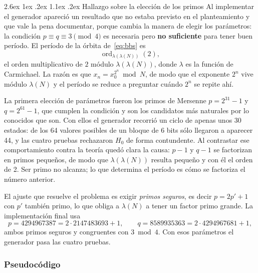 \documentclass[11pt,letterpaper]{article}
\makeatletter
\renewcommand\paragraph{\@startsection{paragraph}{4}{\z@}%
  {2.6ex \@plus 1ex \@minus .2ex}%
  {1.1ex \@plus .2ex}%
  {\normalfont\normalsize\bfseries}}
\DeclareMathOperator{\ord}{ord}
\makeatother
\begin{document}
\paragraph{Hallazgo sobre la elección de los primos}
Al implementar el generador apareció un resultado que no estaba previsto en
el planteamiento y que vale la pena documentar, porque cambia la manera de
elegir los parámetros: la condición $p \equiv q \equiv 3 \pmod 4$ es
necesaria pero \textbf{no suficiente} para tener buen período. El período de
la órbita de~\eqref{eq:bbs} es
\begin{equation}
\ord_{\lambda(\lambda(N))}(2),
\end{equation}
el orden multiplicativo de $2$ módulo $\lambda(\lambda(N))$, donde $\lambda$
es la función de Carmichael. La razón es que
$x_n = x_0^{2^n} \bmod N$, de modo que el exponente $2^n$ vive módulo
$\lambda(N)$ y el período se reduce a preguntar cuándo $2^n$ se repite ahí.

La primera elección de parámetros fueron los primos de Mersenne
$p = 2^{31}-1$ y $q = 2^{61}-1$, que cumplen la condición y son los
candidatos más naturales por lo conocidos que son. Con ellos el generador
recorrió un ciclo de apenas unos 30 estados: de los 64 valores posibles de un
bloque de 6 bits sólo llegaron a aparecer 44, y las cuatro pruebas rechazaron
$H_0$ de forma contundente. Al contrastar ese comportamiento contra la
teoría quedó clara la causa: $p-1$ y $q-1$ se factorizan en primos pequeños,
de modo que $\lambda(\lambda(N))$ resulta pequeño y con él el orden de 2. Ser
primo no alcanza; lo que determina el período es cómo se factoriza el número
anterior.

El ajuste que resuelve el problema es exigir \emph{primos seguros}, es decir
$p = 2p'+1$ con $p'$ también primo, lo que obliga a $\lambda(N)$ a tener un
factor primo grande. La implementación final usa
\[
p = 4294967387 = 2 \cdot 2147483693 + 1, \qquad
q = 8589935363 = 2 \cdot 4294967681 + 1,
\]
ambos primos seguros y congruentes con $3 \bmod 4$. Con esos parámetros el
generador pasa las cuatro pruebas.

\subsubsection{Pseudocódigo}
\end{document}
